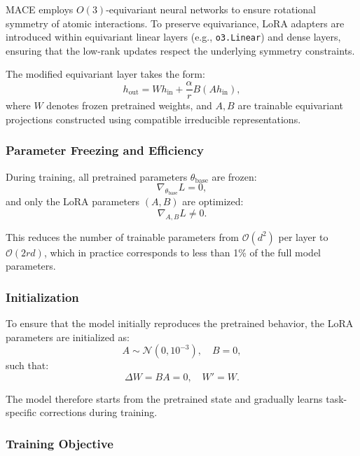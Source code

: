\documentclass[12pt,a4paper,oneside]{book}
\begin{document}
MACE employs $O(3)$-equivariant neural networks to ensure rotational symmetry of atomic interactions. To preserve equivariance, LoRA adapters are introduced within equivariant linear layers (e.g., \texttt{o3.Linear}) and dense layers, ensuring that the low-rank updates respect the underlying symmetry constraints.

The modified equivariant layer takes the form:
\begin{equation}
h_{\text{out}} =
W h_{\text{in}} +
\frac{\alpha}{r} B (A h_{\text{in}}),
\end{equation}
where $W$ denotes frozen pretrained weights, and $A, B$ are trainable equivariant projections constructed using compatible irreducible representations.

\subsubsection{Parameter Freezing and Efficiency}

During training, all pretrained parameters $\theta_{\text{base}}$ are frozen:
\begin{equation}
\nabla_{\theta_{\text{base}}} L = 0,
\end{equation}
and only the LoRA parameters $(A, B)$ are optimized:
\begin{equation}
\nabla_{A,B} L \neq 0.
\end{equation}

This reduces the number of trainable parameters from $\mathcal{O}(d^2)$ per layer to $\mathcal{O}(2rd)$, which in practice corresponds to less than 1\% of the full model parameters.

\subsubsection{Initialization}

To ensure that the model initially reproduces the pretrained behavior, the LoRA parameters are initialized as:
\begin{equation}
A \sim \mathcal{N}(0, 10^{-3}), \quad B = 0,
\end{equation}
such that:
\begin{equation}
\Delta W = BA = 0, \quad W' = W.
\end{equation}

The model therefore starts from the pretrained state and gradually learns task-specific corrections during training.

\subsubsection{Training Objective}
\end{document}
